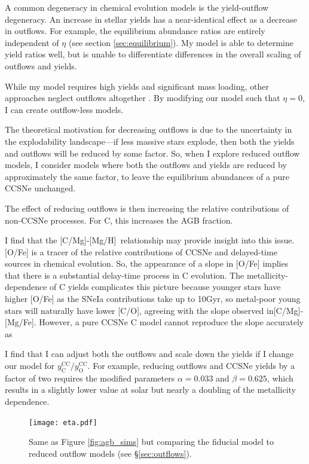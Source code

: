 \documentclass[12pt,oneside]{report}
\newcommand{\caah}{[C/Mg]-[Mg/H]}
\newcommand{\caafe}{[C/Mg]-[Mg/Fe]}
\begin{document}
A common degeneracy in chemical evolution models is the yield-outflow degeneracy. An increase in stellar yields has a near-identical effect as a decrease in outflows. For example, the equilibrium abundance ratios are entirely independent of $\eta$ (see section \ref{sec:equilibrium}). My model is able to determine yield ratios well, but is unable to differentiate differences in the overall scaling of outflows and yields.

While my model requires high yields and significant mass loading, other approaches neglect outflows altogether \citep{MCM13, MCM14, spitoni19, spitoni20, spitoni21}. By modifying our model such that $\eta=0$, I can create outflow-less models.


The theoretical motivation for decreasing outflows is due to the uncertainty in the explodability landscape---if less massive stars explode, then both the yields and outflows will be reduced by some factor. So, when I explore reduced outflow models, I consider models where both the outflows and yields are reduced by approximately the same factor, to leave the equilibrium abundances of a pure CCSNe unchanged. 

The effect of reducing outflows is then increasing the relative contributions of non-CCSNe processes. For C, this increases the AGB fraction.

I find that the \caah~relationship may provide insight into this issue. [O/Fe] is a tracer of the relative contributions of CCSNe and delayed-time sources in chemical evolution. So, the appearance of a slope in [O/Fe] implies that there is a substantial delay-time process in C evolution. 
The metallicity-dependence of C yields complicates this picture because
younger stars have higher [O/Fe] as the SNeIa contributions take up to 10Gyr,
so metal-poor young stars will naturally have lower [C/O], agreeing with the
slope observed in\caafe. However, a pure CCSNe C model cannot reproduce the slope accurately as  


I find that I can adjust both the outflows and scale down the yields if I change our model for $y_\text{C}^\text{CC}/y_\text{O}^\text{CC}$. For example, reducing outflows and CCSNe yields by a factor of two requires the modified parameters
$\alpha = 0.033$ and $\beta = 0.625$, which results in a slightly lower value at solar but nearly a doubling of the metallicity dependence.
\begin{figure}

\texttt{[image: eta.pdf]}

\caption[Reduced-outflow models]{Same as Figure \ref{fig:agb_sims} but comparing the fiducial model to reduced outflow models (see \S \ref{sec:outflows}).}
\end{figure}
\end{document}

